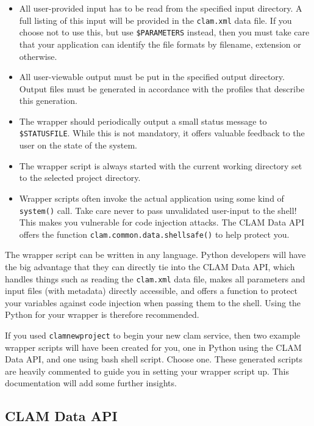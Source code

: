 \documentclass[a4paper,12pt,twoside,openright]{report}
\begin{document}
\begin{itemize}
\item All user-provided input has to be read from the specified input directory. A full listing of this input will be provided in the \texttt{clam.xml} data file. If you choose not to use this, but use \texttt{\$PARAMETERS} instead, then you must take care that your application can identify the file formats by filename, extension or otherwise.
\item All user-viewable output must be put in the specified output directory. Output files must be generated in accordance with the profiles that describe this generation. 
\item The wrapper should periodically output a small status message to
  \texttt{\$STATUSFILE}. While this is not mandatory, it offers valuable feedback to the user on the state of the system. 
\item The wrapper script is always started with the current working directory set to the selected project directory.
\item Wrapper scripts often invoke the actual application using some kind of
  \texttt{system()} call. Take care never to pass unvalidated user-input to the shell! This makes you vulnerable
  for code injection attacks. The CLAM Data API offers the function
  \texttt{clam.common.data.shellsafe()} to help protect you.
\end{itemize}

The wrapper script can be written in any language. Python developers will have
the big advantage that they can directly tie into the CLAM Data API, which
handles things such as reading the \texttt{clam.xml} data file, makes all
parameters and input files (with metadata) directly accessible, and offers a
function to protect your variables against code injection when passing them to
the shell. Using the Python for your wrapper is therefore recommended.

If you used \texttt{clamnewproject} to begin your new clam service, then two
example wrapper scripts will have been created for you, one in Python using the
CLAM Data API, and one using bash shell script. Choose one. These generated
scripts are heavily commented to guide you in setting your wrapper script up.
This documentation will add some further insights.

\subsection{CLAM Data API}
\end{document}
